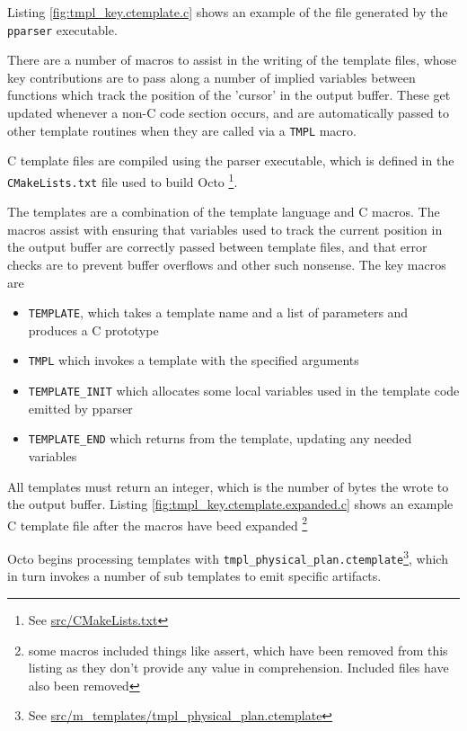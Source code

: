 \documentclass[]{article}
\def\code#1{\texttt{#1}}
\newcommand{\gitlab}[1]{\footnote{See \href{https://gitlab.com/YottaDB/DBMS/YDBOcto/blob/master/#1}{#1}}}
\begin{document}
Listing \ref{fig:tmpl_key.ctemplate.c} shows an example of the file generated by the \code{pparser} executable.

There are a number of macros to assist in the writing of the template files, whose key contributions are to pass along a number of implied variables between functions which track the position of the 'cursor' in the output buffer.
These get updated whenever a non-C code section occurs, and are automatically passed to other template routines when they are called via a \code{TMPL} macro.

C template files are compiled using the parser executable, which is defined in the \code{CMakeLists.txt} file used to build Octo \gitlab{src/CMakeLists.txt}.

The templates are a combination of the template language and C macros.
The macros assist with ensuring that variables used to track the current position in the output buffer are correctly passed between template files, and that error checks are to prevent buffer overflows and other such nonsense.
The key macros are
\begin{itemize}
	\item \code{TEMPLATE}, which takes a template name and a list of parameters and produces a C prototype
	\item \code{TMPL} which invokes a template with the specified arguments
	\item \code{TEMPLATE\_INIT} which allocates some local variables used in the template code emitted by pparser
	\item \code{TEMPLATE\_END} which returns from the template, updating any needed variables
\end{itemize}

All templates must return an integer, which is the number of bytes the wrote to the output buffer.
Listing \ref{fig:tmpl_key.ctemplate.expanded.c} shows an example C template file after the macros have beed expanded \footnote{some macros included things like assert, which have been removed from this listing as they don't provide any value in comprehension. Included files have also been removed}

Octo begins processing templates with \code{tmpl\_physical\_plan.ctemplate}\gitlab{src/m\_templates/tmpl\_physical\_plan.ctemplate}, which in turn invokes a number of sub templates to emit specific artifacts.
\end{document}
